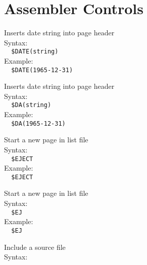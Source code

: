 \documentclass[a4paper,twoside,12pt]{book}
\newcommand{\mysmallfont}{\fontsize{8pt}{10pt} \selectfont{}}
\begin{document}
	\twocolumn
	\section{Assembler Controls}
		\begin{description}
			\mysmallfont{}
			\item[\$date] Inserts date string into page header\\
				Syntax:\\
				\verb'  '{\color{highlight_control}\verb'$DATE'}{\color{highlight_symbol}\verb'('}{\color{highlight_string}\verb'string'}{\color{highlight_symbol}\verb')'}\\
				Example:\\
				\verb'  '{\color{highlight_control}\verb'$DATE'}{\color{highlight_symbol}\verb'('}{\color{highlight_string}\verb'1965-12-31'}{\color{highlight_symbol}\verb')'}\\
			\item[\$da] Inserts date string into page header\\
				Syntax:\\
				\verb'  '				{\color{highlight_control}\verb'$DA'}{\color{highlight_symbol}\verb'('}{\color{highlight_string}\verb'string'}{\color{highlight_symbol}\verb')'}\\
				Example:\\
				\verb'  '				{\color{highlight_control}\verb'$DA'}{\color{highlight_symbol}\verb'('}{\color{highlight_string}\verb'1965-12-31'}{\color{highlight_symbol}\verb')'}\\
			\item[\$eject] Start a new page in list file\\
				Syntax:\\
				\verb'  '{\color{highlight_control}\verb'$EJECT'}\\
				Example:\\
				\verb'  '{\color{highlight_control}\verb'$EJECT'}\\
			\item[\$ej] Start a new page in list file\\
				Syntax:\\
				\verb'  '{\color{highlight_control}\verb'$EJ'}\\
				Example:\\
				\verb'  '{\color{highlight_control}\verb'$EJ'}\\
			\item[\$include] Include a source file\\
				Syntax:\\

\end{description}
\end{document}

